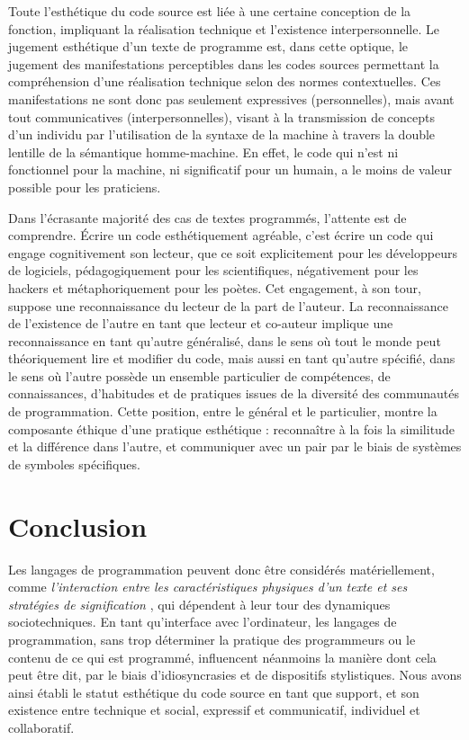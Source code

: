 \documentclass{article}
\begin{document}
Toute l'esthétique du code source est liée à une certaine conception de la fonction, impliquant la réalisation technique et l'existence interpersonnelle. Le jugement esthétique d'un texte de programme est, dans cette optique, le jugement des manifestations perceptibles dans les codes sources permettant la compréhension d'une réalisation technique selon des normes contextuelles. Ces manifestations ne sont donc pas seulement expressives (personnelles), mais avant tout communicatives (interpersonnelles), visant à la transmission de concepts d'un individu par l'utilisation de la syntaxe de la machine à travers la double lentille de la sémantique homme-machine. En effet, le code qui n'est ni fonctionnel pour la machine, ni significatif pour un humain, a le moins de valeur possible pour les praticiens.

Dans l'écrasante majorité des cas de textes programmés, l'attente est de comprendre. Écrire un code esthétiquement agréable, c'est écrire un code qui engage cognitivement son lecteur, que ce soit explicitement pour les développeurs de logiciels, pédagogiquement pour les scientifiques, négativement pour les hackers et métaphoriquement pour les poètes. Cet engagement, à son tour, suppose une reconnaissance du lecteur de la part de l'auteur. La reconnaissance de l'existence de l'autre en tant que lecteur et co-auteur implique une reconnaissance en tant qu'autre généralisé, dans le sens où tout le monde peut théoriquement lire et modifier du code, mais aussi en tant qu'autre spécifié, dans le sens où l'autre possède un ensemble particulier de compétences, de connaissances, d'habitudes et de pratiques issues de la diversité des communautés de programmation. Cette position, entre le général et le particulier, montre la composante éthique d'une pratique esthétique : reconnaître à la fois la similitude et la différence dans l'autre, et communiquer avec un pair par le biais de systèmes de symboles spécifiques.

\section*{Conclusion}

Les langages de programmation peuvent donc être considérés matériellement, comme \emph{l'interaction entre les caractéristiques physiques d'un texte et ses stratégies de signification} \citep{hayles_print_2004}, qui dépendent à leur tour des dynamiques sociotechniques. En tant qu'interface avec l'ordinateur, les langages de programmation, sans trop déterminer la pratique des programmeurs ou le contenu de ce qui est programmé, influencent néanmoins la manière dont cela peut être dit, par le biais d'idiosyncrasies et de dispositifs stylistiques. Nous avons ainsi établi le statut esthétique du code source en tant que support, et son existence entre technique et social, expressif et communicatif, individuel et collaboratif.
\end{document}
